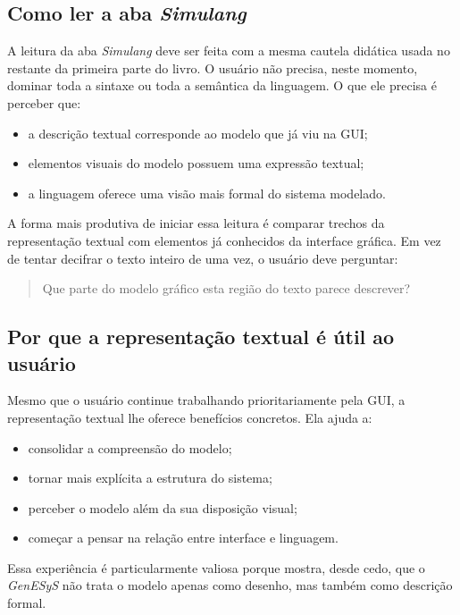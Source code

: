 \subsection{Como ler a aba \textit{Simulang}}
\label{subsec:cap5_como_ler_simulang}

A leitura da aba \textit{Simulang} deve ser feita com a mesma cautela didática usada no restante da primeira parte do livro. O usuário não precisa, neste momento, dominar toda a sintaxe ou toda a semântica da linguagem. O que ele precisa é perceber que:
\begin{itemize}
    \item a descrição textual corresponde ao modelo que já viu na GUI;
    \item elementos visuais do modelo possuem uma expressão textual;
    \item a linguagem oferece uma visão mais formal do sistema modelado.
\end{itemize}

A forma mais produtiva de iniciar essa leitura é comparar trechos da representação textual com elementos já conhecidos da interface gráfica. Em vez de tentar decifrar o texto inteiro de uma vez, o usuário deve perguntar:
\begin{quote}
    Que parte do modelo gráfico esta região do texto parece descrever?
\end{quote}

\subsection{Por que a representação textual é útil ao usuário}
\label{subsec:cap5_por_que_simulang_util_ao_usuario}

Mesmo que o usuário continue trabalhando prioritariamente pela GUI, a representação textual lhe oferece benefícios concretos. Ela ajuda a:
\begin{itemize}
    \item consolidar a compreensão do modelo;
    \item tornar mais explícita a estrutura do sistema;
    \item perceber o modelo além da sua disposição visual;
    \item começar a pensar na relação entre interface e linguagem.
\end{itemize}

Essa experiência é particularmente valiosa porque mostra, desde cedo, que o \textit{GenESyS} não trata o modelo apenas como desenho, mas também como descrição formal.

